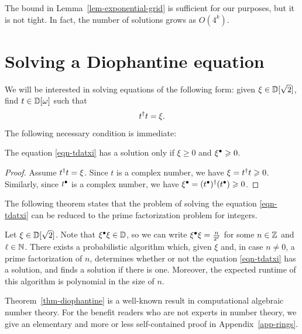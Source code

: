 \documentclass{article}
\begin{document}
\begin{remark}
  The bound in Lemma~\ref{lem-exponential-grid} is sufficient for our
  purposes, but it is not tight. In fact, the number of solutions
  grows as $O(4^k)$.
\end{remark}

\section{Solving a Diophantine equation}
\label{sec-diophantine}

We will be interested in solving equations of the following form:
given $\xi\in{\mathbb{D}}[\sqrt2]$, find $t\in{\mathbb{D}}[\omega]$ such that
\begin{equation}\label{eqn-tdatxi}
  t^{\dagger} t = \xi.
\end{equation}
The following necessary condition is immediate:

\begin{lemma}\label{lem-nec-cond}
  The equation {\eqref{eqn-tdatxi}} has a solution only if $\xi\geq 0$
  and $\xi^{\bullet}\geqslant 0$.
\end{lemma}

\begin{proof}
  Assume $t^{\dagger} t = \xi$. Since $t$ is a complex number, we have
  $\xi=t^{\dagger} t\geqslant 0$. Similarly, since $t^{\bullet}$ is a complex number, we
  have $\xi^{\bullet} = (t^{\bullet})^{\dagger}(t^{\bullet})\geqslant 0$.
\end{proof}

The following theorem states that the problem of solving the equation
{\eqref{eqn-tdatxi}} can be reduced to the prime factorization problem
for integers. 

\begin{theorem}\label{thm-diophantine}
  Let $\xi\in{\mathbb{D}}[\sqrt 2]$. Note that $\xi^{\bullet}\xi\in{\mathbb{D}}$, so we can
  write $\xi^{\bullet}\xi=\frac{n}{2^\ell}$ for some $n\in\mathbb{Z}$ and $\ell\in\mathbb{N}$. 
  There exists a probabilistic algorithm which, given $\xi$ and, in 
  case $n\neq 0$, a prime factorization of $n$, determines whether or 
  not the equation {\eqref{eqn-tdatxi}} has a solution, and finds a 
  solution if there is one. Moreover, the expected runtime of this 
  algorithm is polynomial in the size of $n$.
\end{theorem}

Theorem~\ref{thm-diophantine} is a well-known result in computational
algebraic number theory. For the benefit readers who are not experts
in number theory, we give an elementary and more or less
self-contained proof in Appendix~\ref{app-rings}.
\end{document}
